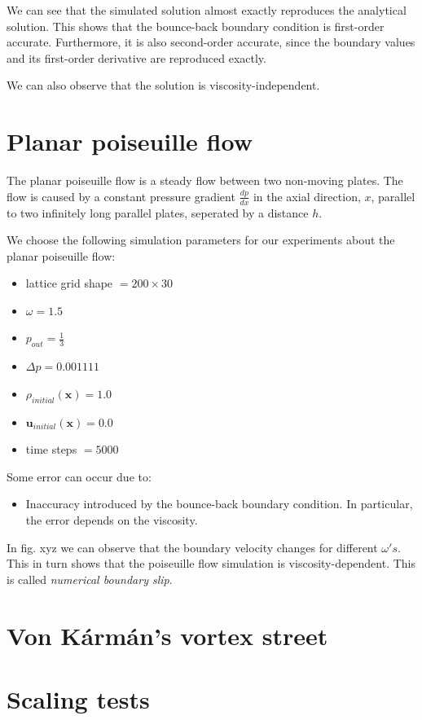 \documentclass[a4paper,11pt, footsepline]{book}
\begin{document}
We can see that the simulated solution almost exactly reproduces the analytical solution. This shows that the bounce-back boundary condition is first-order accurate. Furthermore, it is also second-order accurate, since the boundary values and its first-order derivative are reproduced exactly.

We can also observe that the solution is viscosity-independent.
\section{Planar poiseuille flow}\label{sec-pouseuille}
The planar poiseuille flow is a steady flow between two non-moving plates. The flow is caused by a constant pressure gradient $\frac{dp}{dx}$ in the axial direction, $x$, parallel to two infinitely long parallel plates, seperated by a distance $h$.

We choose the following simulation parameters for our experiments about the planar poiseuille flow:
\begin{itemize}
\setlength\itemsep{0.15em}
\item lattice grid shape $=200\times 30$
\item $\omega=1.5$
\item $p_{out}=\frac{1}{3}$
\item $\Delta p=0.001111$
\item $\rho_{initial}(\mathbf{x})=1.0$
\item $\mathbf{u}_{initial}(\mathbf{x})=0.0$
\item time steps $=5000$
\end{itemize}

Some error can occur due to:
\begin{itemize}
\item Inaccuracy introduced by the bounce-back boundary condition. In particular, the error depends on the viscosity.\cite{Kruger.2016}
\end{itemize}

In fig. xyz we can observe that the boundary velocity changes for different $\omega 's$. This in turn shows that the poiseuille flow simulation is viscosity-dependent. This is called \textit{numerical boundary slip}. \cite{Kruger.2016}
\section{Von K\'{a}rm\'{a}n's vortex street}\label{sec-karman}
\section{Scaling tests}\label{sec-scaling}
\end{document}
